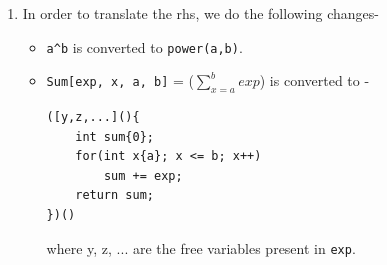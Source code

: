 \documentclass[12pt]{report}
\begin{document}
\begin{enumerate}
\begin{enumerate}
            \item In order to translate the rhs, we do the following changes-
            \begin{itemize}
                \item \verb|a^b| is converted to \texttt{power(a,b)}.
                \item \texttt{Sum[exp, x, a, b]} = ($\sum_{x=a}^{b}exp$) is converted to -\\
                \begin{lstlisting}
([y,z,...](){
    int sum{0};
    for(int x{a}; x <= b; x++)
        sum += exp;
    return sum;
})()
                \end{lstlisting}
                where y, z, ... are the free variables present in \texttt{exp}.
            \end{itemize} 
        \end{enumerate}
    \end{enumerate}
    
\end{document}
